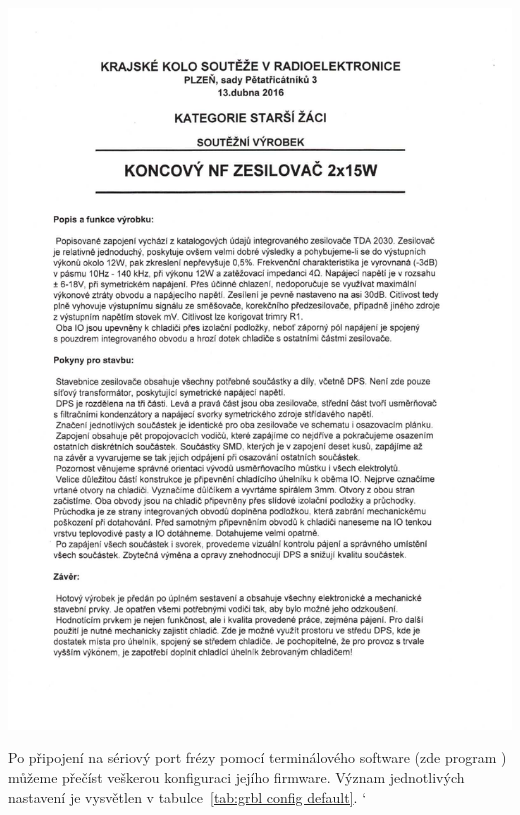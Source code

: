 \noindent
\includegraphics[page=2, clip, bb=20mm 89mm 175mm 270mm, width=1.0\textwidth]{prilohy/TDA2030-dokumentace.pdf}



\clearpage
{}
\label{app:grbl config}
Po připojení na sériový port frézy pomocí terminálového software (zde program
) můžeme přečíst veškerou konfiguraci jejího firmware. Význam
jednotlivých nastavení je vysvětlen v tabulce~\vref{tab:grbl config default}.
\begingroup
\catcode`

\endgroup

